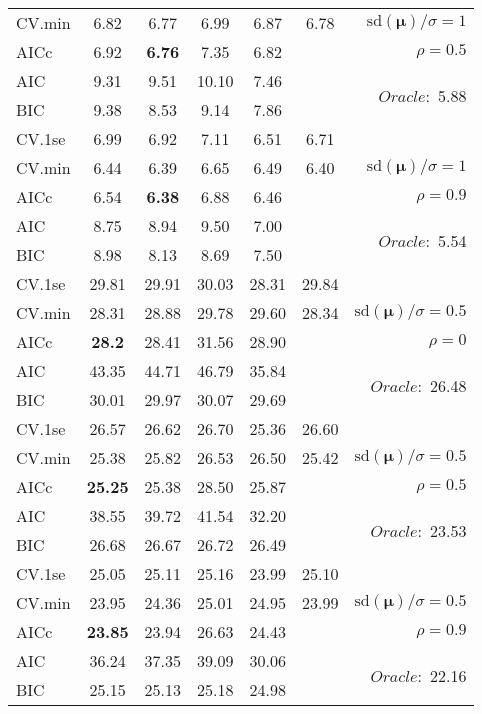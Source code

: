 \begin{table}
\begin{center}
\begin{tabular}{l*{5}{c}|r}
CV.min & 6.82 & 6.77 & 6.99 & 6.87 & 6.78 &  $\mathrm{sd}(\mathbf{\mu})/\sigma=1$ \\
AICc & 6.92 & {\bf 6.76} & 7.35 & 6.82 & & $\rho=0.5$ \\
AIC & 9.31 & 9.51 & 10.10 & 7.46 & &  \multirow{2}{*}{$Oracle: $ 5.88} \\
BIC & 9.38 & 8.53 & 9.14 & 7.86 & &  \\
 \hline 
CV.1se & 6.99 & 6.92 & 7.11 & 6.51 & 6.71 & \\
CV.min & 6.44 & 6.39 & 6.65 & 6.49 & 6.40 &  $\mathrm{sd}(\mathbf{\mu})/\sigma=1$ \\
AICc & 6.54 & {\bf 6.38} & 6.88 & 6.46 & & $\rho=0.9$ \\
AIC & 8.75 & 8.94 & 9.50 & 7.00 & &  \multirow{2}{*}{$Oracle: $ 5.54} \\
BIC & 8.98 & 8.13 & 8.69 & 7.50 & &  \\
 \hline 
CV.1se & 29.81 & 29.91 & 30.03 & 28.31 & 29.84 & \\
CV.min & 28.31 & 28.88 & 29.78 & 29.60 & 28.34 &  $\mathrm{sd}(\mathbf{\mu})/\sigma=0.5$ \\
AICc & {\bf 28.2} & 28.41 & 31.56 & 28.90 & & $\rho=0$ \\
AIC & 43.35 & 44.71 & 46.79 & 35.84 & &  \multirow{2}{*}{$Oracle: $ 26.48} \\
BIC & 30.01 & 29.97 & 30.07 & 29.69 & &  \\
 \hline 
CV.1se & 26.57 & 26.62 & 26.70 & 25.36 & 26.60 & \\
CV.min & 25.38 & 25.82 & 26.53 & 26.50 & 25.42 &  $\mathrm{sd}(\mathbf{\mu})/\sigma=0.5$ \\
AICc & {\bf 25.25} & 25.38 & 28.50 & 25.87 & & $\rho=0.5$ \\
AIC & 38.55 & 39.72 & 41.54 & 32.20 & &  \multirow{2}{*}{$Oracle: $ 23.53} \\
BIC & 26.68 & 26.67 & 26.72 & 26.49 & &  \\
 \hline 
CV.1se & 25.05 & 25.11 & 25.16 & 23.99 & 25.10 & \\
CV.min & 23.95 & 24.36 & 25.01 & 24.95 & 23.99 &  $\mathrm{sd}(\mathbf{\mu})/\sigma=0.5$ \\
AICc & {\bf 23.85} & 23.94 & 26.63 & 24.43 & & $\rho=0.9$ \\
AIC & 36.24 & 37.35 & 39.09 & 30.06 & &  \multirow{2}{*}{$Oracle: $ 22.16} \\
BIC & 25.15 & 25.13 & 25.18 & 24.98 & &  \\
 \hline 
\end{tabular}
\end{center}
\vspace{-1cm}
\end{table}




